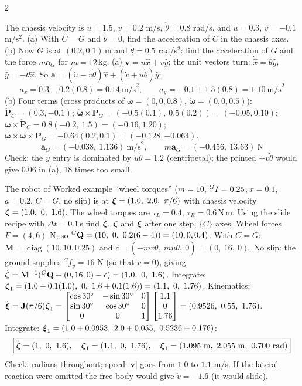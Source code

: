 \begin{multicols}{2}
\begin{examq}
The chassis velocity is $u=1.5$, $v=0.2$ m/s, $\dot\theta=0.8$ rad/s, and $\dot u=0.3$, $\dot v=-0.1$ m/s$^2$. (a) With $C=G$ and $\ddot\theta=0$, find the acceleration of $C$ in the chassis axes. (b) Now $G$ is at $(0.2,0.1)$\,m and $\ddot\theta=0.5$ rad/s$^2$: find the acceleration of $G$ and the force $m\mathbf a_G$ for $m=12$\,kg.
\solution
(a) $\mathbf v=u\hat x+v\hat y$; the unit vectors turn: $\dot{\hat x}=\dot\theta\hat y$, $\dot{\hat y}=-\dot\theta\hat x$. So $\mathbf a=(\dot u-v\dot\theta)\hat x+(\dot v+u\dot\theta)\hat y$:
\[\boxed{a_x=0.3-0.2(0.8)=0.14\ \text{m/s}^2,\qquad a_y=-0.1+1.5(0.8)=1.10\ \text{m/s}^2}\]
(b) Four terms (cross products of $\boldsymbol\omega=(0,0,0.8)$, $\dot{\boldsymbol\omega}=(0,0,0.5)$): $\ddot{\mathbf P}_C=(0.3,-0.1)$; $\dot{\boldsymbol\omega}\times\mathbf P_G=(-0.5(0.1),\ 0.5(0.2))=(-0.05,0.10)$; $\boldsymbol\omega\times\dot{\mathbf P}_C=0.8(-0.2,\ 1.5)=(-0.16,1.20)$; $\boldsymbol\omega\times\boldsymbol\omega\times\mathbf P_G=-0.64(0.2,0.1)=(-0.128,-0.064)$.
\[\boxed{\mathbf a_G=(-0.038,\ 1.136)\ \text{m/s}^2,\qquad m\mathbf a_G=(-0.456,\ 13.63)\ \text{N}}\]
Check: the $y$ entry is dominated by $u\dot\theta=1.2$ (centripetal); the printed $+v\dot\theta$ would give $0.06$ in (a), 18 times too small. \chk
\end{examq}

\begin{examq}
The robot of Worked example ``wheel torques'' ($m=10$, ${}^{G}I=0.25$, $r=0.1$, $a=0.2$, $C=G$, no slip) is at $\wEx=(1.0,\ 2.0,\ \pi/6)$ with chassis velocity $\boldsymbol\zeta=(1.0,\ 0,\ 1.6)$. The wheel torques are $\tau_L=0.4$, $\tau_R=0.6$\,N\,m. Using the slide recipe with $\Delta t=0.1$\,s find $\dot{\boldsymbol\zeta}$, $\boldsymbol\zeta$ and $\boldsymbol\xi$ after one step.
\solution
$\{C\}$ axes. Wheel forces $F=(4,6)$ N, so $\wEQC=(10,\ 0,\ 0.2(6-4))=(10,0,0.4)$. With $C=G$: $\mathbf M=\operatorname{diag}(10,10,0.25)$ and $c=(-mv\dot\theta,\ mu\dot\theta,\ 0)=(0,\ 16,\ 0)$. No slip: the ground supplies ${}^Cf_y=16$ N (so that $\dot v=0$), giving $\dot{\boldsymbol\zeta}=\mathbf M^{-1}({}^{C}\mathbf Q+(0,16,0)-c)=(1.0,\ 0,\ 1.6)$.
Integrate: $\wEz_1=(1.0+0.1(1.0),\ 0,\ 1.6+0.1(1.6))=(1.1,\ 0,\ 1.76)$. Kinematics: $\dot{\wEx}=\mathbf J(\pi/6)\wEz_1=\begin{bmatrix}\cos30^\circ&-\sin30^\circ&0\\\sin30^\circ&\cos30^\circ&0\\0&0&1\end{bmatrix}\begin{bmatrix}1.1\\0\\1.76\end{bmatrix}=(0.9526,\ 0.55,\ 1.76)$.
Integrate: $\wEx_1=(1.0+0.0953,\ 2.0+0.055,\ 0.5236+0.176)$:
\[\boxed{\dot{\wEz}=(1,\ 0,\ 1.6),\quad\wEz_1=(1.1,\ 0,\ 1.76),\quad\wEx_1=(1.095\ \text{m},\ 2.055\ \text{m},\ 0.700\ \text{rad})}\]
Check: radians throughout; speed $|\mathbf v|$ goes from $1.0$ to $1.1$ m/s. If the lateral reaction were omitted the free body would give $\dot v=-1.6$ (it would slide). \chk
\end{examq}


\end{multicols}
